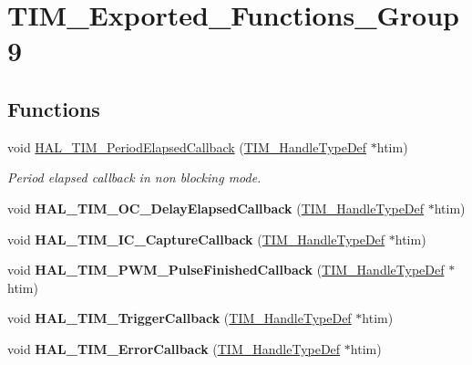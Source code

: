 \hypertarget{group___t_i_m___exported___functions___group9}{}\section{T\+I\+M\+\_\+\+Exported\+\_\+\+Functions\+\_\+\+Group9}
\label{group___t_i_m___exported___functions___group9}
\subsection*{Functions}
\begin{DoxyCompactItemize}
\item 
void \mbox{\hyperlink{group___t_i_m___exported___functions___group9_ga8a3b0ad512a6e6c6157440b68d395eac}{H\+A\+L\+\_\+\+T\+I\+M\+\_\+\+Period\+Elapsed\+Callback}} (\mbox{\hyperlink{struct_t_i_m___handle_type_def}{T\+I\+M\+\_\+\+Handle\+Type\+Def}} $\ast$htim)
\begin{DoxyCompactList}\small\item\em Period elapsed callback in non blocking mode. \end{DoxyCompactList}\item 
\mbox{\label{group___t_i_m___exported___functions___group9_ga1fc39499fe9db8b7fb88005e9f107a36}} 
void {\bfseries H\+A\+L\+\_\+\+T\+I\+M\+\_\+\+O\+C\+\_\+\+Delay\+Elapsed\+Callback} (\mbox{\hyperlink{struct_t_i_m___handle_type_def}{T\+I\+M\+\_\+\+Handle\+Type\+Def}} $\ast$htim)
\item 
\mbox{\label{group___t_i_m___exported___functions___group9_ga77a2401a35ddd9bd0b8fc28331b81381}} 
void {\bfseries H\+A\+L\+\_\+\+T\+I\+M\+\_\+\+I\+C\+\_\+\+Capture\+Callback} (\mbox{\hyperlink{struct_t_i_m___handle_type_def}{T\+I\+M\+\_\+\+Handle\+Type\+Def}} $\ast$htim)
\item 
\mbox{\label{group___t_i_m___exported___functions___group9_ga07e5fc4d223b16bec2fd6bed547cf91d}} 
void {\bfseries H\+A\+L\+\_\+\+T\+I\+M\+\_\+\+P\+W\+M\+\_\+\+Pulse\+Finished\+Callback} (\mbox{\hyperlink{struct_t_i_m___handle_type_def}{T\+I\+M\+\_\+\+Handle\+Type\+Def}} $\ast$htim)
\item 
\mbox{\label{group___t_i_m___exported___functions___group9_ga189577c72b1963671b26820d8161d678}} 
void {\bfseries H\+A\+L\+\_\+\+T\+I\+M\+\_\+\+Trigger\+Callback} (\mbox{\hyperlink{struct_t_i_m___handle_type_def}{T\+I\+M\+\_\+\+Handle\+Type\+Def}} $\ast$htim)
\item 
\mbox{\label{group___t_i_m___exported___functions___group9_ga6f0868af383d592940700dbb52fac016}} 
void {\bfseries H\+A\+L\+\_\+\+T\+I\+M\+\_\+\+Error\+Callback} (\mbox{\hyperlink{struct_t_i_m___handle_type_def}{T\+I\+M\+\_\+\+Handle\+Type\+Def}} $\ast$htim)
\end{DoxyCompactItemize}


